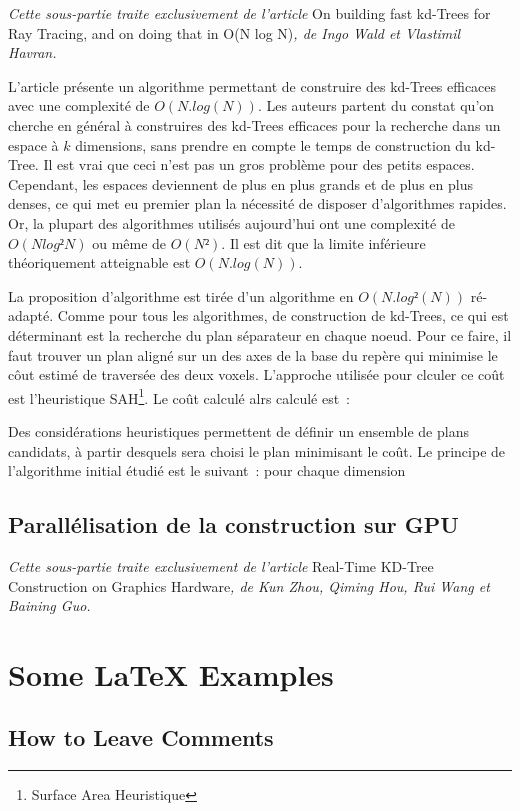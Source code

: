 \documentclass[a4paper]{article}
\begin{document}
\textit{Cette sous-partie traite exclusivement de l'article} On building fast kd-Trees for Ray Tracing, and on doing that in O(N log N)\textit{, de Ingo Wald et Vlastimil Havran.}

L'article présente un algorithme permettant de construire des kd-Trees efficaces avec une complexité de $O(N.log(N))$. Les auteurs partent du constat qu'on cherche en général à construires des kd-Trees efficaces pour la recherche dans un espace à $k$ dimensions, sans prendre en compte le temps de construction du kd-Tree. Il est vrai que ceci n'est pas un gros problème pour des petits espaces. Cependant, les espaces deviennent de plus en plus grands et de plus en plus denses, ce qui met eu premier plan la nécessité de disposer d'algorithmes rapides. Or, la plupart des algorithmes utilisés aujourd'hui ont une complexité de $O(Nlog²N)$ ou même de $O(N²)$. Il est dit que la limite inférieure théoriquement atteignable est $O(N.log(N))$.

La proposition d'algorithme est tirée d'un algorithme en $O(N.log²(N))$ ré-adapté. Comme pour tous les algorithmes, de construction de kd-Trees, ce qui est déterminant est la recherche du plan séparateur en chaque noeud. Pour ce faire, il faut trouver un plan aligné sur un des axes de la base du repère qui minimise le côut estimé de traversée des deux voxels. L'approche utilisée pour clculer ce coût est l'heuristique SAH\footnote{Surface Area Heuristique}. Le coût calculé alrs calculé est~:


Des considérations heuristiques permettent de définir un ensemble de plans candidats, à partir desquels sera choisi le plan minimisant le coût. Le principe de l'algorithme initial étudié est le suivant~: pour chaque dimension

\subsection{Parallélisation de la construction sur GPU}

\textit{Cette sous-partie traite exclusivement de l'article} Real-Time KD-Tree Construction on Graphics Hardware\textit{, de Kun Zhou, Qiming Hou, Rui Wang et Baining Guo.}

\section{Some \LaTeX{} Examples}
\label{sec:examples}

\subsection{How to Leave Comments}
\end{document}

